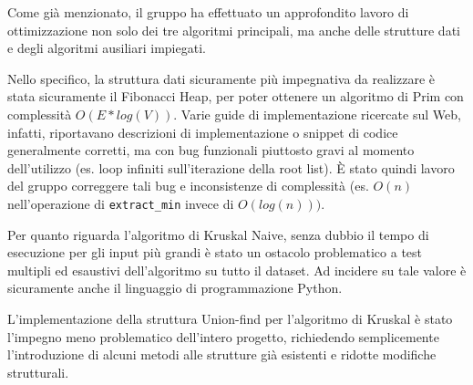 Come già menzionato, il gruppo ha effettuato un approfondito lavoro di ottimizzazione non solo dei tre algoritmi principali, ma anche delle strutture dati e degli algoritmi ausiliari impiegati.

Nello specifico, la struttura dati sicuramente più impegnativa da realizzare è stata sicuramente il Fibonacci Heap, per poter ottenere un algoritmo di Prim con complessità $O(E*log(V))$. Varie guide di implementazione ricercate sul Web, infatti, riportavano descrizioni di implementazione o snippet di codice generalmente corretti, ma con bug funzionali piuttosto gravi al momento dell'utilizzo (es. loop infiniti sull'iterazione della root list). È stato quindi lavoro del gruppo correggere tali bug e inconsistenze di complessità (es. $O(n)$ nell'operazione di \texttt{extract\_min} invece di $O(log(n)))$.

Per quanto riguarda l'algoritmo di Kruskal Naive, senza dubbio il tempo di esecuzione per gli input più grandi è stato un ostacolo problematico a test multipli ed esaustivi dell'algoritmo su tutto il dataset. Ad incidere su tale valore è sicuramente anche il linguaggio di programmazione Python.

L'implementazione della struttura Union-find per l'algoritmo di Kruskal è stato l'impegno meno problematico dell'intero progetto, richiedendo semplicemente l'introduzione di alcuni metodi alle strutture già esistenti e ridotte modifiche strutturali.